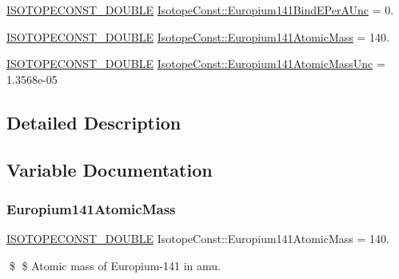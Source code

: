 \begin{DoxyCompactItemize}
\mbox{\hyperlink{group___isotope_const-_macros_ga8f45a7272ce02c0b4c65c44636ed719a}{I\+S\+O\+T\+O\+P\+E\+C\+O\+N\+S\+T\+\_\+\+D\+O\+U\+B\+LE}} \mbox{\hyperlink{group___isotope_const-_europium-_eu141_gae3d436061d58937c6cb4c250e9cbbe11}{Isotope\+Const\+::\+Europium141\+Bind\+E\+Per\+A\+Unc}} = 0.
\item 
\mbox{\hyperlink{group___isotope_const-_macros_ga8f45a7272ce02c0b4c65c44636ed719a}{I\+S\+O\+T\+O\+P\+E\+C\+O\+N\+S\+T\+\_\+\+D\+O\+U\+B\+LE}} \mbox{\hyperlink{group___isotope_const-_europium-_eu141_ga391842ea5c67de30251dfa552f421c16}{Isotope\+Const\+::\+Europium141\+Atomic\+Mass}} = 140.
\item 
\mbox{\hyperlink{group___isotope_const-_macros_ga8f45a7272ce02c0b4c65c44636ed719a}{I\+S\+O\+T\+O\+P\+E\+C\+O\+N\+S\+T\+\_\+\+D\+O\+U\+B\+LE}} \mbox{\hyperlink{group___isotope_const-_europium-_eu141_ga9f8173b5c7fc2df8c82cc924e0240364}{Isotope\+Const\+::\+Europium141\+Atomic\+Mass\+Unc}} = 1.\+3568e-\/05
\end{DoxyCompactItemize}


\subsection{Detailed Description}


\subsection{Variable Documentation}
\mbox{\label{group___isotope_const-_europium-_eu141_ga391842ea5c67de30251dfa552f421c16}} 
\subsubsection{\texorpdfstring{Europium141\+Atomic\+Mass}{Europium141AtomicMass}}
{\footnotesize\ttfamily \mbox{\hyperlink{group___isotope_const-_macros_ga8f45a7272ce02c0b4c65c44636ed719a}{I\+S\+O\+T\+O\+P\+E\+C\+O\+N\+S\+T\+\_\+\+D\+O\+U\+B\+LE}} Isotope\+Const\+::\+Europium141\+Atomic\+Mass = 140.}

\$ \$ Atomic mass of Europium-\/141 in amu. \mbox{\label{group___isotope_const-_europium-_eu141_ga9f8173b5c7fc2df8c82cc924e0240364}} 
